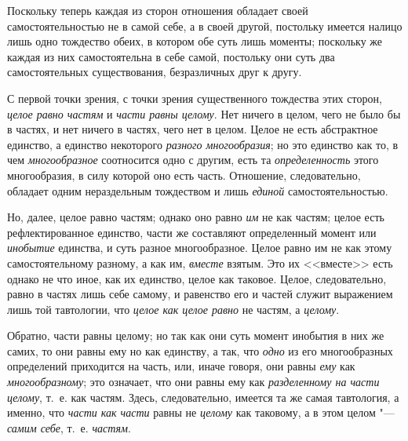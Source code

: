 Поскольку теперь каждая из сторон отношения обладает своей
самостоятельностью не в самой себе, а в своей другой, постольку имеется
налицо лишь одно тождество обеих, в котором обе суть лишь моменты;
поскольку же каждая из них самостоятельна в себе самой, постольку они суть
два самостоятельных существования, безразличных друг к другу.

С первой точки зрения, с точки зрения существенного тождества этих сторон,
{\em целое равно частям} и
{\em части равны целому}. Нет ничего в целом, чего не
было бы в частях, и нет ничего в частях, чего нет в целом. Целое не есть
абстрактное единство, а единство некоторого
{\em разного многообразия}; но это единство как то, в
чем {\em многообразное} соотносится одно с другим, есть
та {\em определенность} этого многообразия, в силу
которой оно есть часть. Отношение, следовательно, обладает одним
нераздельным тождеством и лишь {\em единой}
самостоятельностью.

Но, далее, целое равно частям; однако оно равно {\em им}
не как частям; целое есть рефлектированное единство, части же составляют
определенный момент или {\em инобытие} единства, и суть
разное многообразное. Целое равно им не как этому самостоятельному разному,
а как им, {\em вместе} взятым. Это их <<вместе>> есть
однако не что иное, как их единство, целое как таковое. Целое,
следовательно, равно в частях лишь себе самому, и равенство его и частей
служит выражением лишь той тавтологии, что {\em целое
как целое равно} не частям, а {\em целому}.

Обратно, части равны целому; но так как они суть момент инобытия в них же
самих, то они равны ему но как единству, а так, что
{\em одно} из его многообразных определений приходится
на часть, или, иначе говоря, они равны {\em ему} как
{\em многообразному}; это означает, что они равны ему
как {\em разделенному на части целому}, т.~е. как
частям. Здесь, следовательно, имеется та же самая тавтология, а именно, что
{\em части как части} равны не {\em целому} как таковому, а в этом целом
"--- {\em самим себе}, т.~е. {\em частям}.

